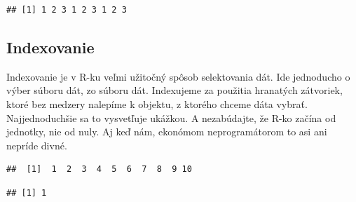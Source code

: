 \begin{verbatim}
## [1] 1 2 3 1 2 3 1 2 3
\end{verbatim}

\hypertarget{indexovanie}{%
\subsection{Indexovanie}\label{indexovanie}}

Indexovanie je v R-ku veľmi užitočný spôsob selektovania dát. Ide
jednoducho o výber súboru dát, zo súboru dát. Indexujeme za použitia
hranatých zátvoriek, ktoré bez medzery nalepíme k objektu, z ktorého
chceme dáta vybrať. Najjednoduchšie sa to vysvetľuje ukážkou. A
nezabúdajte, že R-ko začína od jednotky, nie od nuly. Aj keď nám,
ekonómom neprogramátorom to asi ani nepríde divné.

\begin{Shaded}
\begin{Highlighting}[]
\StringTok{ }\NormalTok{(}\OperatorTok{:}\NormalTok{)}

\end{Highlighting}
\end{Shaded}

\begin{verbatim}
##  [1]  1  2  3  4  5  6  7  8  9 10
\end{verbatim}

\begin{Shaded}
\begin{Highlighting}[]
\NormalTok{obycajny_vektor[}\NormalTok{]}
\end{Highlighting}
\end{Shaded}

\begin{verbatim}
## [1] 1
\end{verbatim}

\begin{Shaded}
\begin{Highlighting}[]
\NormalTok{obycajny_vektor[}\NormalTok{(}\NormalTok{, }\NormalTok{)]}
\end{Highlighting}
\end{Shaded}

